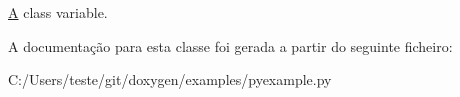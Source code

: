 \hyperlink{class_a}{A} class variable. 



A documentação para esta classe foi gerada a partir do seguinte ficheiro\-:\begin{DoxyCompactItemize}
\item 
C\-:/\-Users/teste/git/doxygen/examples/pyexample.\-py\end{DoxyCompactItemize}
